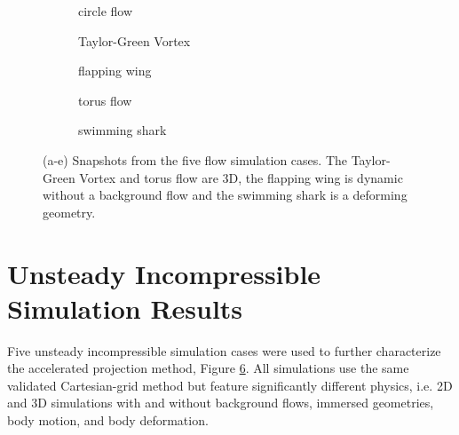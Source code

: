 \documentclass[review]{elsarticle}
\begin{document}
\begin{figure}
    \centering
    \begin{subfigure}[b]{0.3\textwidth}
        \centering
        \caption{circle flow}
        \label{fig:circle}
    \end{subfigure}
    \begin{subfigure}[b]{0.3\textwidth}
        \centering
        \caption{Taylor-Green Vortex}
        \label{fig:TGV}
    \end{subfigure}
    \begin{subfigure}[b]{0.3\textwidth}
        \centering
        \caption{flapping wing}
        \label{fig:wing}
    \end{subfigure}
        \begin{subfigure}{0.47\textwidth}
        \centering
        \caption{torus flow}
        \label{fig:donut}
        \end{subfigure}
        \hfill
        \begin{subfigure}{0.47\textwidth}
        \centering
        \caption{swimming shark}
        \label{fig:shark}
        \end{subfigure}
    \hfill
    \caption{(a-e) Snapshots from the five flow simulation cases. The Taylor-Green Vortex and torus flow are 3D, the flapping wing is dynamic without a background flow and the swimming shark is a deforming geometry.}
    \label{fig:simulation cases}
\end{figure}

\section{Unsteady Incompressible Simulation Results}

Five unsteady incompressible simulation cases were used to further characterize the accelerated projection method, Figure \ref{fig:simulation cases}. All simulations use the same validated Cartesian-grid method \cite{maertens2015accurate} but feature significantly different physics, i.e. 2D and 3D simulations with and without background flows, immersed geometries, body motion, and body deformation.
\end{document}
